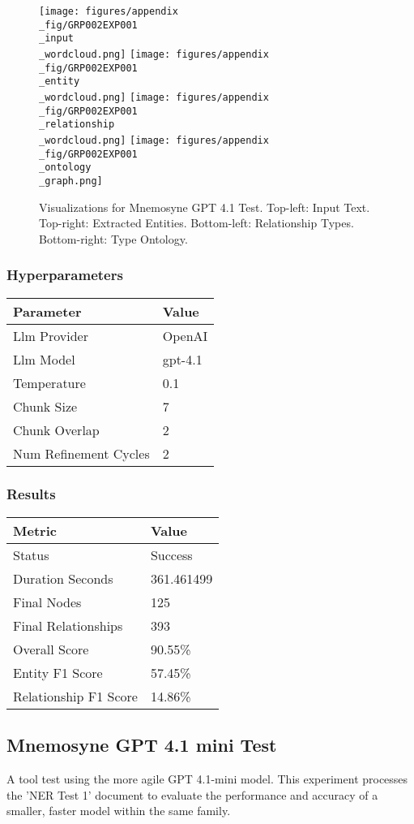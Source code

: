 \begin{figure}[!ht]
  \centering
  \texttt{[image: figures/appendix\\\_fig/GRP002EXP001\\\_input\\\_wordcloud.png]}
  \texttt{[image: figures/appendix\\\_fig/GRP002EXP001\\\_entity\\\_wordcloud.png]}
  \texttt{[image: figures/appendix\\\_fig/GRP002EXP001\\\_relationship\\\_wordcloud.png]}
  \texttt{[image: figures/appendix\\\_fig/GRP002EXP001\\\_ontology\\\_graph.png]}
  \caption{Visualizations for Mnemosyne GPT 4.1 Test. Top-left: Input Text. Top-right: Extracted Entities. Bottom-left: Relationship Types. Bottom-right: Type Ontology.}
\end{figure}
\clearpage
\subsubsection{Hyperparameters}
\begin{tabular}{ll}
\toprule
\textbf{Parameter} & \textbf{Value} \\
\midrule
Llm Provider & OpenAI \\
Llm Model & gpt-4.1 \\
Temperature & 0.1 \\
Chunk Size & 7 \\
Chunk Overlap & 2 \\
Num Refinement Cycles & 2 \\
\bottomrule
\end{tabular}

\subsubsection{Results}
\begin{tabular}{ll}
\toprule
\textbf{Metric} & \textbf{Value} \\
\midrule
Status & Success \\
Duration Seconds & 361.461499 \\
Final Nodes & 125 \\
Final Relationships & 393 \\
Overall Score & 90.55\% \\
Entity F1 Score & 57.45\% \\
Relationship F1 Score & 14.86\% \\
\bottomrule
\end{tabular}
\subsection{Mnemosyne GPT 4.1 mini Test}
A tool test using the more agile GPT 4.1-mini model. This experiment processes the 'NER Test 1' document to evaluate the performance and accuracy of a smaller, faster model within the same family.

